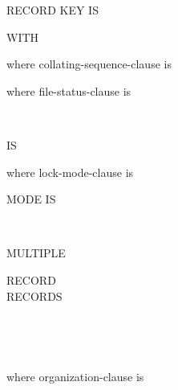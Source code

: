  RECORD KEY IS \identifier
{}
\begin{0-1}
  WITH 
\end{0-1}

where collating-sequence-clause is



where file-status-clause is

\begin{0-1}
   \\
\end{0-1}
 IS \identifier

where lock-mode-clause is

 MODE IS
\begin{1=}
  \begin{1=}
    \begin{1=}
       \\
    \end{1=}
    \begin{1=}
        MULTIPLE
      \begin{1=}
        RECORD \\
        RECORDS
      \end{1=} \\
    \end{1=}
  \end{1=} \\
\end{1=}

where organization-clause is

